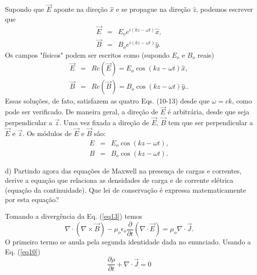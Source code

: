 \begin{enumerate}[start=1,label={\bfseries Q\arabic*.}]
\resposta Supondo que $\vec{E}$ aponte na direção $\hat{x}$ e se propague na direção $\hat{z}$, podemos escrever que
%
\begin{equation}
\begin{array}{ccc}
  \vec{E} &=& E_{o} e^{i (kz - \omega t)} \hat{x} , \\
  \vec{B} &=& B_{o} e^{i(kz - \omega t)} \hat{y} \label{eq19} .  
\end{array}
\end{equation}
%
Os campos "físicos" podem ser escritos como (supondo $E_{o}$ e $B_{o}$ reais)
%
\begin{equation}
\begin{array}{ccc}
  \vec{E} &=& Re(\vec{E}) = E_{o} \cos (kz - \omega t) \hat{x} , \\
  \vec{B} &=& Re(\vec{B}) = B_{o} \cos (kz - \omega t) \hat{y} . \label{eq21} .
\end{array}
\end{equation}
%
Essas soluções, de fato, satisfazem as quatro Eqs. (10-13) desde que $ \omega = c k$, como pode ser verificado. De maneira geral, a direção de $\vec{E}$ é arbitrária, desde que seja perpendicular a $\vec{z}$. Uma vez fixada a direção de $\vec{E}$, $\vec{B}$ tem que ser perpendicular a $\vec{E}$ e $\vec{z}$. Os módulos de $\vec{E}$ e $\vec{B}$ são:
%
\begin{equation}
\begin{array}{ccc}
  E & = & E_{o} \cos(kz - \omega t), \\
  B & = & B_{o} \cos(kz - \omega t) .
\end{array}
\end{equation}
%

d) Partindo agora das equações de Maxwell na presença de cargas e correntes, derive a equação que relaciona as densidades de carga e de corrente elétrica (equação da continuidade). Que lei de conservação é expressa matematicamente por esta equação?


\resposta Tomando a divergência da Eq. (\ref{eq13}) temos
%
\begin{equation}\label{eq22}
  \nabla \cdot (\nabla \times \vec{B}) - \mu_{o} \epsilon_{o} \frac{\partial}{\partial t} (\nabla \cdot \vec{E}) = \mu_{o} \nabla \cdot \vec{J} .
\end{equation}
%
O primeiro termo se anula pela segunda identidade dada no enunciado. Usando a Eq. (\ref{eq10})
%
\begin{equation}
  \frac{\partial \rho}{\partial t} + \nabla \cdot \vec{J} = 0
\end{equation}


\end{enumerate}
